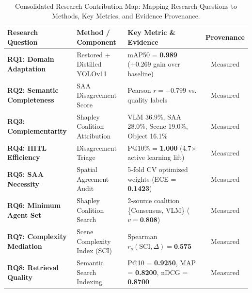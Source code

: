 \documentclass[12pt,onecolumn,a4paper]{IEEEtran}
\begin{document}
\begin{table}[!htbp]
\centering
\caption{Consolidated Research Contribution Map: Mapping Research Questions to Methods, Key Metrics, and Evidence Provenance.}
\label{tab:research_contributions}
\begin{tabular}{lllc}
\toprule
\textbf{Research Question} & \textbf{Method / Component} & \textbf{Key Metric \& Evidence} & \textbf{Provenance} \\
\midrule
\textbf{RQ1: Domain Adaptation} & Restored + Distilled YOLOv11 & mAP50 = \textbf{0.989} (+0.269 gain over baseline) & Measured \\
\textbf{RQ2: Semantic Completeness} & SAA Disagreement Score & Pearson $r = \bm{-0.799}$ vs. quality labels & Measured \\
\textbf{RQ3: Complementarity} & Shapley Coalition Attribution & VLM 36.9\%, SAA 28.0\%, Scene 19.0\%, Object 16.1\% & Measured \\
\textbf{RQ4: HITL Efficiency} & Disagreement Triage & P@10\% = \textbf{1.000} (4.7$\times$ active learning lift) & Measured \\
\textbf{RQ5: SAA Necessity} & Spatial Agreement Audit & 5-fold CV optimized weights (ECE = \textbf{0.1423}) & Measured \\
\textbf{RQ6: Minimum Agent Set} & Shapley Coalition Search & 2-source coalition \{Consensus, VLM\} ($v = \textbf{0.808}$) & Measured \\
\textbf{RQ7: Complexity Mediation} & Scene Complexity Index (SCI) & Spearman $r_s(\text{SCI}, \Delta) = \textbf{0.575}$ & Measured \\
\textbf{RQ8: Retrieval Quality} & Semantic Search Indexing & P@10 = \textbf{0.9250}, MAP = \textbf{0.8200}, nDCG = \textbf{0.8700} & Measured \\
\bottomrule
\end{tabular}
\end{table}
\end{document}
